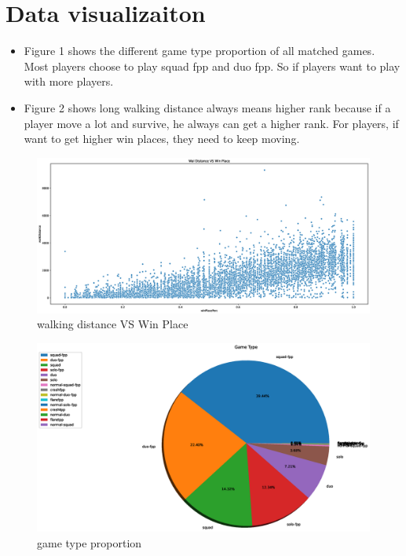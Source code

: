 \section{Data visualizaiton} \label{sec-method}
\begin{itemize}
  \item Figure 1 shows the different game type proportion of all matched games.
  Most players choose to play squad fpp and duo fpp. So if players want to play with more players.
  \item Figure 2 shows long walking distance always means higher rank because if a player move a lot and survive,
  he always can get a higher rank. For players, if want to get higher win places, they need to keep moving.
\end{itemize}
\begin{figure}
  \centering
  \includegraphics[width=1\textwidth]{scatter.eps}
  \caption{walking distance VS Win Place} 
  \label{scatter}
\end{figure}
\begin{figure}
  \centering
  \includegraphics[width=1\textwidth]{pie.eps}
  \caption{game type proportion} 
  \label{pie}
\end{figure}

